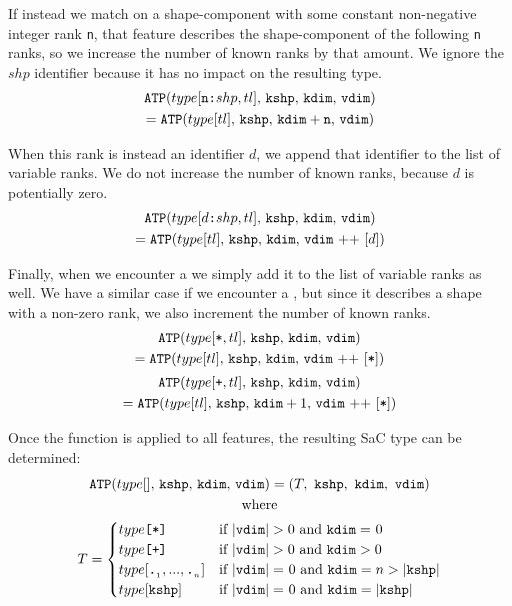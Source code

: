 \noindent
If instead we match on a shape-component with some constant non-negative integer rank \texttt{n}, that feature describes the shape-component of the following \texttt{n} ranks, so we increase the number of known ranks by that amount.
We ignore the $shp$ identifier because it has no impact on the resulting type.
\begin{gather*}
    \texttt{ATP}(type[\texttt{n}\texttt{:}shp,tl],\,\texttt{kshp},\,\texttt{kdim},\,\texttt{vdim}) \\
        = \texttt{ATP}(type[tl],\,\texttt{kshp},\,\texttt{kdim}+\texttt{n},\,\texttt{vdim})
\end{gather*}

\noindent
When this rank is instead an identifier $d$, we append that identifier to the list of variable ranks.
We do not increase the number of known ranks, because $d$ is potentially zero.
\begin{gather*}
    \texttt{ATP}(type[d\texttt{:}shp,tl],\,\texttt{kshp},\,\texttt{kdim},\,\texttt{vdim}) \\
        = \texttt{ATP}(type[tl],\,\texttt{kshp},\,\texttt{kdim},\,\texttt{vdim} \text{ ++ } [d])
\end{gather*}

\noindent
Finally, when we encounter a \tpstar{} we simply add it to the list of variable ranks as well.
We have a similar case if we encounter a \tpplus{}, but since it describes a shape with a non-zero rank, we also increment the number of known ranks.
\begin{gather*}
    \texttt{ATP}(type[\texttt{*},tl],\,\texttt{kshp},\,\texttt{kdim},\,\texttt{vdim}) \\
        = \texttt{ATP}(type[tl],\,\texttt{kshp},\,\texttt{kdim},\,\texttt{vdim} \text{ ++ } [\texttt{*}{}])
    \\[2pt]
    \texttt{ATP}(type[\texttt{+},tl],\,\texttt{kshp},\,\texttt{kdim},\,\texttt{vdim}) \\
        = \texttt{ATP}(type[tl],\,\texttt{kshp},\,\texttt{kdim}+1,\,\texttt{vdim} \text{ ++ } [\texttt{*}{}])
\end{gather*}

\noindent
Once the function is applied to all features,
the resulting SaC type can be determined:
\begin{gather*}
    \texttt{ATP}(type[],\,\texttt{kshp},\,\texttt{kdim},\,\texttt{vdim}) = (T,\ \texttt{kshp},\ \texttt{kdim},\ \texttt{vdim}) \\
        \text{where} \\
        T = \begin{cases}
            type\texttt{[*]}
                &\text{if } |\texttt{vdim}| > 0
                \text{ and } \texttt{kdim} =\hspace{0.6pt} 0 \\
            type\texttt{[+]}
                &\text{if } |\texttt{vdim}| > 0
                \text{ and } \texttt{kdim} > 0 \\
            type[\texttt{\textbf{.}}_{_1}, ..., \texttt{\textbf{.}}_{_n}]
                &\text{if } |\texttt{vdim}| =\hspace{0.6pt} 0
                \text{ and } \texttt{kdim} = n > |\texttt{kshp}| \\
            type[\texttt{kshp}]
                &\text{if } |\texttt{vdim}| =\hspace{0.6pt} 0
                \text{ and } \texttt{kdim} = |\texttt{kshp}|
        \end{cases}
\end{gather*}

